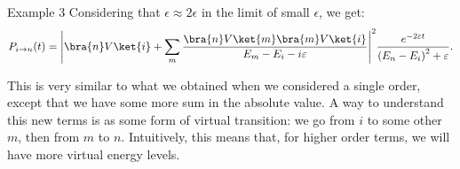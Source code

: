 \documentclass[a4paper]{article}
\begin{document}
\begin{parag}{Example 3}
    Considering that $\epsilon \approx 2\epsilon$ in the limit of small $\epsilon$, we get: 
    \[P_{i \to n}\left(t\right) = \left|\bra{n} V \ket{i} + \sum_{m} \frac{\bra{n} V \ket{m}\bra{m} V \ket{i}}{E_m - E_i - i \epsilon}\right|^2 \frac{e^{- 2 \epsilon t}}{\left(E_n - E_i\right)^2 + \epsilon}. \]

    This is very similar to what we obtained when we considered a single order, except that we have some more sum in the absolute value. A way to understand this new terms is as some form of virtual transition: we go from $i$ to some other $m$, then from $m$ to $n$. Intuitively, this means that, for higher order terms, we will have more virtual energy levels.
\end{parag}
\end{document}
